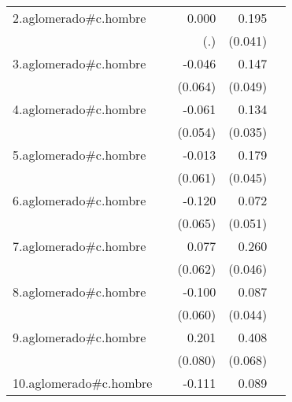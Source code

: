 {\begin{longtable}{l*{4}{D{.}{.}{-1}}}
\addlinespace
2.aglomerado#c.hombre&                     &       0.000         &       0.195\sym{***}&                     \\
            &                     &         (.)         &     (0.041)         &                     \\
\addlinespace
3.aglomerado#c.hombre&                     &      -0.046         &       0.147\sym{**} &                     \\
            &                     &     (0.064)         &     (0.049)         &                     \\
\addlinespace
4.aglomerado#c.hombre&                     &      -0.061         &       0.134\sym{***}&                     \\
            &                     &     (0.054)         &     (0.035)         &                     \\
\addlinespace
5.aglomerado#c.hombre&                     &      -0.013         &       0.179\sym{***}&                     \\
            &                     &     (0.061)         &     (0.045)         &                     \\
\addlinespace
6.aglomerado#c.hombre&                     &      -0.120         &       0.072         &                     \\
            &                     &     (0.065)         &     (0.051)         &                     \\
\addlinespace
7.aglomerado#c.hombre&                     &       0.077         &       0.260\sym{***}&                     \\
            &                     &     (0.062)         &     (0.046)         &                     \\
\addlinespace
8.aglomerado#c.hombre&                     &      -0.100         &       0.087\sym{*}  &                     \\
            &                     &     (0.060)         &     (0.044)         &                     \\
\addlinespace
9.aglomerado#c.hombre&                     &       0.201\sym{*}  &       0.408\sym{***}&                     \\
            &                     &     (0.080)         &     (0.068)         &                     \\
\addlinespace
10.aglomerado#c.hombre&                     &      -0.111\sym{*}  &       0.089\sym{*}  &                     \\

\end{longtable}}
